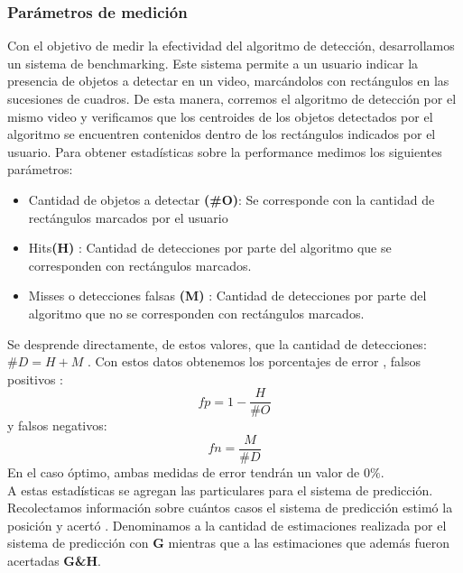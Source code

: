 \subsubsection{Par\'ametros de medici\'on}
Con el objetivo de  medir la efectividad del algoritmo de detecci\'on, desarrollamos un sistema de benchmarking. Este sistema permite
a un usuario indicar la presencia de objetos a detectar en un video, marc\'andolos con rect\'angulos en las sucesiones de cuadros. De esta
manera, corremos el algoritmo de detecci\'on por el mismo video y verificamos que los centroides de los objetos detectados por el algoritmo 
se encuentren contenidos dentro de los rect\'angulos indicados por el 
usuario. Para obtener estad\'isticas sobre la performance  
medimos los siguientes par\'ametros:
\begin{itemize}
\item { Cantidad de objetos a detectar \textbf{(\#O)}: Se corresponde con la cantidad de rect\'angulos marcados por el usuario}
\item { Hits\textbf{(H)} : Cantidad de detecciones por parte del algoritmo que se corresponden con rect\'angulos marcados.}
\item { Misses o detecciones falsas \textbf{(M)} : Cantidad de detecciones por parte del algoritmo que no se corresponden con rect\'angulos marcados.}
\end{itemize}
Se desprende directamente, de estos valores, que la cantidad de detecciones: 
\textbf{$\#D=H+M$} .
Con estos datos obtenemos los porcentajes de error , falsos positivos : 
\[
	fp=1 - \frac{H}{\# O}
\]
y falsos negativos:
\[
	fn=\frac{M}{\# D}
\]
En el caso \'optimo, ambas medidas de error tendr\'an un valor de $0\%$.  \\
\indent A estas estad\'isticas se agregan las particulares para el sistema de predicci\'on. Recolectamos informaci\'on sobre
cu\'antos casos el sistema de predicci\'on estim\'o la posici\'on y acert\'o . Denominamos
a la cantidad de estimaciones realizada por el sistema de predicci\'on 
con \textbf{G} mientras que a las estimaciones que adem\'as fueron 
acertadas \textbf{G\&H}.

